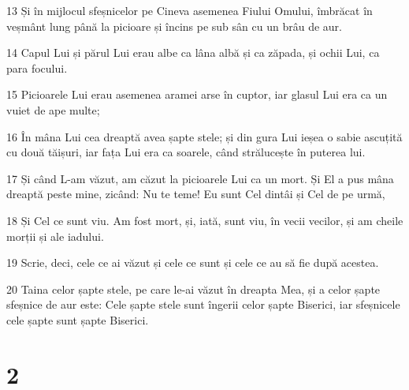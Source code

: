 \par 13 Și în mijlocul sfeșnicelor pe Cineva asemenea Fiului Omului, îmbrăcat în veșmânt lung până la picioare și încins pe sub sân cu un brâu de aur.
\par 14 Capul Lui și părul Lui erau albe ca lâna albă și ca zăpada, și ochii Lui, ca para focului.
\par 15 Picioarele Lui erau asemenea aramei arse în cuptor, iar glasul Lui era ca un vuiet de ape multe;
\par 16 În mâna Lui cea dreaptă avea șapte stele; și din gura Lui ieșea o sabie ascuțită cu două tăișuri, iar fața Lui era ca soarele, când strălucește în puterea lui.
\par 17 Și când L-am văzut, am căzut la picioarele Lui ca un mort. Și El a pus mâna dreaptă peste mine, zicând: Nu te teme! Eu sunt Cel dintâi și Cel de pe urmă,
\par 18 Și Cel ce sunt viu. Am fost mort, și, iată, sunt viu, în vecii vecilor, și am cheile morții și ale iadului.
\par 19 Scrie, deci, cele ce ai văzut și cele ce sunt și cele ce au să fie după acestea.
\par 20 Taina celor șapte stele, pe care le-ai văzut în dreapta Mea, și a celor șapte sfeșnice de aur este: Cele șapte stele sunt îngerii celor șapte Biserici, iar sfeșnicele cele șapte sunt șapte Biserici.

\chapter{2}

